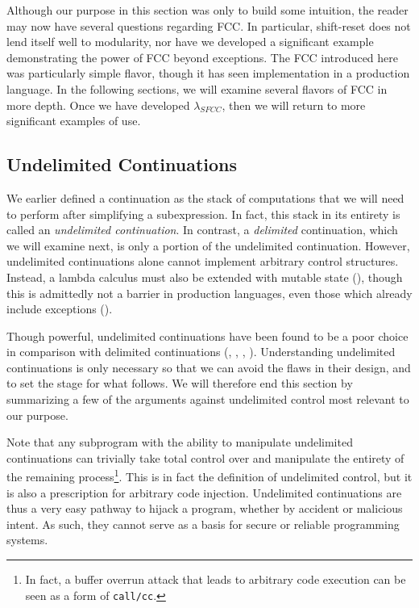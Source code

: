\documentclass[11pt]{article}
\begin{document}
Although our purpose in this section was only to build some intuition, the reader may now have several questions regarding FCC.
In particular, shift-reset does not lend itself well to modularity, nor have we developed a significant example demonstrating the power of FCC beyond exceptions.
The FCC introduced here was particularly simple flavor, though it has seen implementation in a production language.
In the following sections, we will examine several flavors of FCC in more depth.
Once we have developed $\lambda_{SFCC}$, then we will return to more significant examples of use.


\newpage %
\subsection{Undelimited Continuations}
\label{undelimControl}

We earlier defined a continuation as the stack of computations that we will need to perform after simplifying a subexpression.
In fact, this stack in its entirety is called an \emph{undelimited continuation}.
In contrast, a \emph{delimited} continuation, which we will examine next, is only a portion of the undelimited continuation.
However, undelimited continuations alone cannot implement arbitrary control structures.
Instead, a lambda calculus must also be extended with mutable state  (\cite{Filinski94}), though this is admittedly not a barrier in production languages, even those which already include exceptions  (\cite{GreatEscape}).

Though powerful, undelimited continuations have been found to be a poor choice in comparison with delimited continuations (\cite{MFDC}, \cite{continuationsInProcObjs}, \cite{HandlingControl}, \cite{Sitaram90}).
Understanding undelimited continuations is only necessary so that we can avoid the flaws in their design, and to set the stage for what follows.
We will therefore end this section by summarizing a few of the arguments against undelimited control most relevant to our purpose.

Note that any subprogram with the ability to manipulate undelimited continuations can trivially take total control over and manipulate the entirety of the remaining process\footnote{In fact, a buffer overrun attack that leads to arbitrary code execution can be seen as a form of \texttt{call/cc}.}.
This is in fact the definition of undelimited control, but it is also a prescription for arbitrary code injection.
Undelimited continuations are thus a very easy pathway to hijack a program, whether by accident or malicious intent.
As such, they cannot serve as a basis for secure or reliable programming systems.
\end{document}
